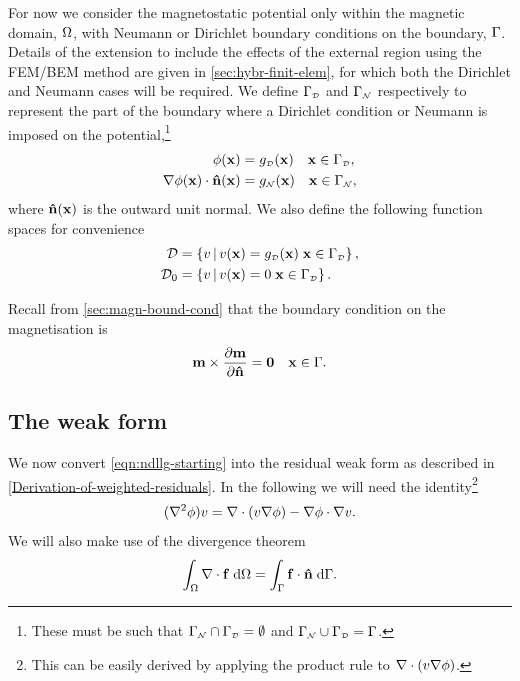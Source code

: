 {For now we consider the magnetostatic potential only within the magnetic domain, $\Omega$, with Neumann or Dirichlet boundary conditions on the boundary, ${\Gamma}$.
Details of the extension to include the effects of the external region using the FEM/BEM method are given in \cref{sec:hybr-finit-elem}, for which both the Dirichlet and Neumann cases will be required.
We define ${\Gamma}_{\scriptscriptstyle{\mathcal{D}}}$ and ${\Gamma}_{\scriptscriptstyle{\mathcal{N}}}$ respectively to represent the part of the boundary where a Dirichlet condition or Neumann is imposed on the potential,\footnote{These must be such that ${\Gamma}_{\scriptscriptstyle{\mathcal{N}}} \cap {\Gamma}_{\scriptscriptstyle{\mathcal{D}}} = \emptyset$ and ${\Gamma}_{\scriptscriptstyle{\mathcal{N}}} \cup {\Gamma}_{\scriptscriptstyle{\mathcal{D}}} = {\Gamma}$.} \ie
\begin{equation}
  \begin{aligned}
    \phi(\boldsymbol{\mathrm{x}}) &= g_{\scriptscriptstyle{\mathcal{D}}}(\boldsymbol{\mathrm{x}}) \quad  \boldsymbol{\mathrm{x}} \in {\Gamma}_{\scriptscriptstyle{\mathcal{D}}}, \\
    \nabla \phi(\boldsymbol{\mathrm{x}}) \cdot \boldsymbol{\mathrm{\hat{n}}}(\boldsymbol{\mathrm{x}}) &= g_{\scriptscriptstyle{\mathcal{N}}}(\boldsymbol{\mathrm{x}}) \quad  \boldsymbol{\mathrm{x}} \in {\Gamma}_{\scriptscriptstyle{\mathcal{N}}},
  \end{aligned}
\end{equation}
where $\boldsymbol{\mathrm{\hat{n}}}(\boldsymbol{\mathrm{x}})$ is the outward unit normal.
We also define the following function spaces for convenience
\begin{equation}
\begin{aligned}
  \label{eq:037}
  \Dfs & = \setst{ v }{ v(\xv) = g_\Dir(\xv) \;  \xv \in \boundd_\Dir }, \\
  \Dfs_0 &= \setst{ v }{ v(\xv) = 0 \;  \xv \in \boundd_\Dir }.
\end{aligned}
\end{equation}

Recall from \cref{sec:magn-bound-cond} that the boundary condition on the magnetisation is
\begin{equation}
  \label{eq:m-bc}
  \mv \times \dmdn = \zerov \quad \xv \in \boundd.
\end{equation}


\subsection{The weak form}
\label{sec:weak-form-residuals}

We now convert \cref{eqn:ndllg-starting} into the residual weak form as described in \cref{Derivation-of-weighted-residuals}.
In the following we will need the identity\footnote{This can be easily derived by applying the product rule to $\nabla \cdot (v \nabla \phi)$.}
\begin{equation}
  (\lap \phim) \test = \div (v \grad \phim) - \grad \phim \cdot \grad v.
  \label{eq:20}
\end{equation}
We will also make use of the divergence theorem
\begin{equation}
  \intd{\div \fv} = \intb{\fv \cdot \nv}.
  \label{eq:div-thm}
\end{equation}

}
